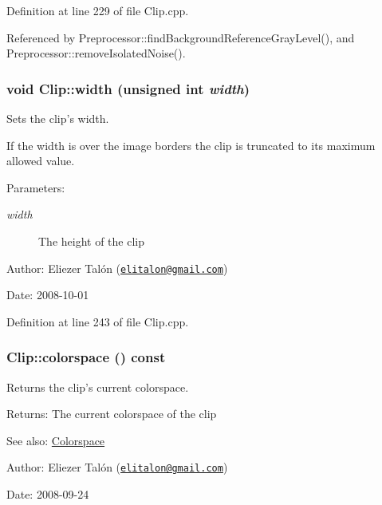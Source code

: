 Definition at line 229 of file Clip.cpp.

Referenced by Preprocessor::findBackgroundReferenceGrayLevel(), and Preprocessor::removeIsolatedNoise().\hypertarget{class_clip_17c1a23e159bedb6e2988235b8b568e7}{
\subsubsection[width]{\setlength{\rightskip}{0pt plus 5cm}void Clip::width (unsigned int {\em width})}}
\label{class_clip_17c1a23e159bedb6e2988235b8b568e7}


Sets the clip's width. 

If the width is over the image borders the clip is truncated to its maximum allowed value.

\begin{Desc}
\item[Parameters:]
\begin{description}
\item[{\em width}]The height of the clip\end{description}
\end{Desc}
\begin{Desc}
\item[Author:]Eliezer Talón (\href{mailto:elitalon@gmail.com}{\tt elitalon@gmail.com}) \end{Desc}
\begin{Desc}
\item[Date:]2008-10-01 \end{Desc}


Definition at line 243 of file Clip.cpp.\hypertarget{class_clip_e22de9122a399af67576eb114842846a}{
\subsubsection[colorspace]{ Clip::colorspace () const}}
\label{class_clip_e22de9122a399af67576eb114842846a}


Returns the clip's current colorspace. 

\begin{Desc}
\item[Returns:]The current colorspace of the clip\end{Desc}
\begin{Desc}
\item[See also:]\hyperlink{_colorspace_8h_7a7e24cdb2a27271343f0adceff89f65}{Colorspace}\end{Desc}
\begin{Desc}
\item[Author:]Eliezer Talón (\href{mailto:elitalon@gmail.com}{\tt elitalon@gmail.com}) \end{Desc}
\begin{Desc}
\item[Date:]2008-09-24 \end{Desc}


